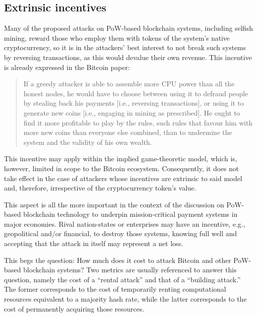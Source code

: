 \subsection{Extrinsic incentives}

Many of the proposed attacks on PoW-based blockchain systems, including selfish mining, reward those who employ them with tokens of the system's native cryptocurrency, so it is in the attackers' best interest to not break such systems by reversing transactions, as this would devalue their own revenue.
This incentive is already expressed in the Bitcoin paper: \autocite[4]{bitcoin2008paper}

\begin{quote}
	If a greedy attacker is able to assemble more CPU power than all the honest nodes, he would have to choose between using it to defraud people by stealing back his payments [i.e., reversing transactions], or using it to generate new coins [i.e., engaging in mining as prescribed].
	He ought to find it more profitable to play by the rules, such rules that favour him with more new coins than everyone else combined, than to undermine the system and the validity of his own wealth.
\end{quote}

This incentive may apply within the implied game-theoretic model, which is, however, limited in scope to the Bitcoin ecosystem.
Consequently, it does not take effect in the case of attackers whose incentives are extrinsic to said model and, therefore, irrespective of the cryptocurrency token's value.

This aspect is all the more important in the context of the discussion on PoW-based blockchain technology to underpin mission-critical payment systems in major economies.
Rival nation-states or enterprises may have an incentive, e.g., geopolitical and/or financial, to destroy those systems, knowing full well and accepting that the attack in itself may represent a net loss.

This begs the question:
How much does it cost to attack Bitcoin and other PoW-based blockchain systems?
Two metrics are usually referenced to answer this question, namely the cost of a ``rental attack'' and that of a ``building attack.''
The former corresponds to the cost of temporarily renting computational resources equivalent to a majority hash rate, while the latter corresponds to the cost of permanently acquiring those resources.

